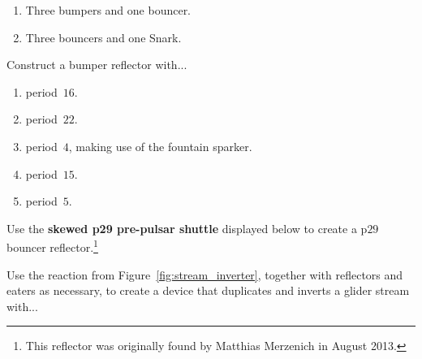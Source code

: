 \begin{multicols}{2}
\begin{problemstar}
		\begin{enumerate}[label=\bf\color{ocre}(\alph*)]
			\item Three bumpers and one bouncer.
			
			\item Three bouncers and one Snark.
		\end{enumerate}
	\end{problemstar}
	
	
	\mfilbreak
	
	
	\begin{problemstar}\label{exer:bumper_high_period}
		Construct a bumper reflector with...\smallskip
		
		\begin{enumerate}[label=\bf\color{ocre}(\alph*)]
			\item {} period~$16$.
			
			\item {} period~$22$.
			
			\item {} period~$4$, making use of the fountain sparker.
			
			\item {} period~$15$.
			
			\item {} period~$5$.
			
		\end{enumerate}
	\end{problemstar}


	\mfilbreak
	
	
	\begin{problemstar}\label{exer:p29_pipsquirter} 
		Use the \textbf{skewed p29 pre-pulsar shuttle} displayed below to create a p$29$ bouncer reflector.\footnote{This reflector was originally found by Matthias Merzenich in August 2013.}
		
		\begin{center}
		\end{center}
	\end{problemstar}


	\mfilbreak
	
	
	\begin{problem}\label{exer:make_inline_inverter_with_weird_period} 
		Use the reaction from Figure~\ref{fig:stream_inverter}, together with reflectors and eaters as necessary, to create a device that duplicates and inverts a glider stream with...\smallskip
		

\end{problem}
\end{multicols}
